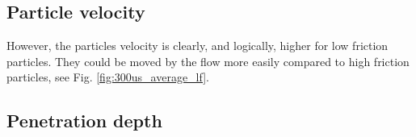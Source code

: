 

\subsection{Particle velocity}
\label{subsec:particlevelocity}

However, the particles velocity is clearly, and logically, higher for low
friction particles. 
They could be moved by the flow more easily compared to high
friction particles, see Fig. \ref{fig:300us_average_lf}.






\subsection{Penetration depth}
\label{subsec:penetrationdepth}

